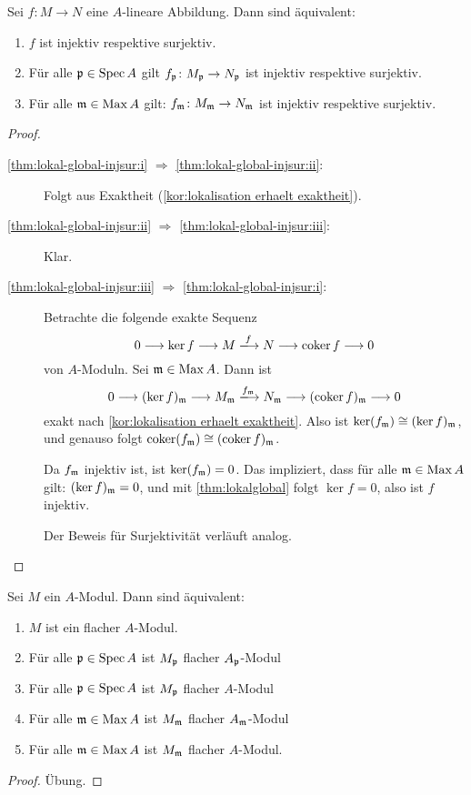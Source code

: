 \documentclass[12pt,a4paper]{scrartcl}
\theoremstyle{cplain}
\theoremstyle{cdef}
\begin{document}
\begin{satz}
	Sei $f\colon M\to N$ eine $A$-lineare Abbildung. Dann sind äquivalent:
	\begin{enumerate}
		\item $f$ ist injektiv respektive surjektiv. \label{thm:lokal-global-injsur:i}
		\item Für alle $\mathfrak{p}\in \operatorname{Spec} A$ gilt $f_{\mathfrak{p}}\colon M_{\mathfrak{p}}\to N_{\mathfrak{p}}$ ist injektiv respektive surjektiv. \label{thm:lokal-global-injsur:ii}
		\item Für alle $\mathfrak{m}\in \operatorname{Max} A$ gilt: $f_{\mathfrak{m}}\colon M_{\mathfrak{m}}\to N_{\mathfrak{m}}$ ist injektiv respektive surjektiv. \label{thm:lokal-global-injsur:iii}
	\end{enumerate}
\end{satz}
\begin{proof}
	\leavevmode
	\begin{description}
		\item[\ref{thm:lokal-global-injsur:i} $\Rightarrow$ \ref{thm:lokal-global-injsur:ii}:] Folgt aus Exaktheit (\cref{kor:lokalisation erhaelt exaktheit}).
		\item[\ref{thm:lokal-global-injsur:ii} $\Rightarrow$ \ref{thm:lokal-global-injsur:iii}:] Klar.
		\item[\ref{thm:lokal-global-injsur:iii} $\Rightarrow$ \ref{thm:lokal-global-injsur:i}:] Betrachte die folgende exakte Sequenz
		\[0\longrightarrow \ker f \longrightarrow M \xlongrightarrow{f} N\longrightarrow \coker f \longrightarrow 0\]
		von $A$-Moduln. Sei $\mathfrak{m}\in \operatorname{Max} A$. Dann ist 
		\[0\longrightarrow (\ker f)_\fm \longrightarrow M_\fm \xlongrightarrow{f_\fm} N_\fm\longrightarrow (\coker f)_\fm \longrightarrow 0\]
		exakt nach \cref{kor:lokalisation erhaelt exaktheit}. Also ist $\operatorname{ker}(f_{\mathfrak{m}}) \cong (\operatorname{ker} f)_{\mathfrak{m}}$, und genauso folgt $\operatorname{coker}(f_{\mathfrak{m}})\cong (\operatorname{coker} f)_{\mathfrak{m}}$.
		
		Da $f_{\mathfrak{m}}$ injektiv ist, ist $\operatorname{ker} (f_{\mathfrak{m}}) = 0$. Das impliziert, dass für alle $\mathfrak{m}\in \operatorname{Max} A$ gilt: $(\operatorname{ker} f)_{\mathfrak{m}} = 0$, und mit \cref{thm:lokalglobal} folgt $\ker f = 0$, also ist $f$ injektiv.
		
		Der Beweis für Surjektivität verläuft analog.
		\qedhere
	\end{description}
\end{proof}

\begin{satz}
	Sei $M$ ein $A$-Modul. Dann sind äquivalent:
	\begin{enumerate}
		\item $M$ ist ein flacher $A$-Modul.
		\item Für alle $\mathfrak{p}\in\operatorname{Spec} A$ ist $M_{\mathfrak{p}}$ flacher $A_{\mathfrak{p}}$-Modul
		\item Für alle $\mathfrak{p}\in\operatorname{Spec} A$ ist $M_{\mathfrak{p}}$ flacher $A$-Modul
		\item Für alle $\mathfrak{m}\in\operatorname{Max} A$ ist $M_{\mathfrak{m}}$ flacher $A_{\mathfrak{m}}$-Modul
		\item Für alle $\mathfrak{m}\in\operatorname{Max} A$ ist $M_{\mathfrak{m}}$ flacher $A$-Modul.
	\end{enumerate}
	
\end{satz}
\begin{proof}
	Übung.
\end{proof}
\end{document}
